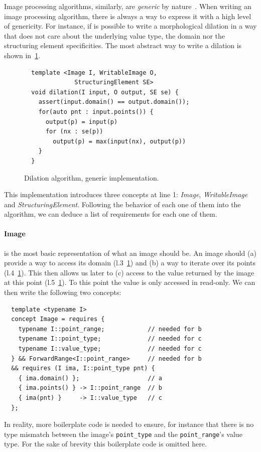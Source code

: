 Image processing algorithms, similarly, are \emph{generic} by
nature~\cite{ritter.1990.cvgi,geraud.2000.icpr,darbon.2002.ismm,levillain.2010.icip,levillain.2014.ciarp}. When writing
an image processing algorithm, there is always a way to express it with a high level of genericity. For instance, if is
possible to write a morphological dilation in a way that does not care about the underlying value type, the domain nor
the structuring element specificities. The most abstract way to write a dilation is shown in~\ref{code:gen.dilate}.

\begin{figure}[tbh]
  \centering
  \begin{verbatim}
  template <Image I, WritableImage O,
              StructuringElement SE>
  void dilation(I input, O output, SE se) {
    assert(input.domain() == output.domain());
    for(auto pnt : input.points()) {
      output(p) = input(p)
      for (nx : se(p))
        output(p) = max(input(nx), output(p))
    }
  }
  \end{verbatim}
  \caption{Dilation algorithm, generic implementation.}
  \label{code:gen.dilate}
\end{figure}

This implementation introduces three concepts at line 1: \emph{Image}, \emph{WritableImage} and
\emph{StructuringElement}. Following the behavior of each one of them into the algorithm, we can deduce a list of
requirements for each one of them.

\paragraph{Image} is the most basic representation of what an image should be. An image should (a) provide a way to
access its domain (l.3~\ref{code:gen.dilate}) and (b) a way to iterate over its points (l.4~\ref{code:gen.dilate}). This
then allows us later to (c) access to the value returned by the image at this point (l.5~\ref{code:gen.dilate}). To this
point the value is only accessed in read-only. We can then write the following two concepts:
\begin{verbatim}
  template <typename I>
  concept Image = requires {
    typename I::point_range;            // needed for b
    typename I::point_type;             // needed for c
    typename I::value_type;             // needed for c
  } && ForwardRange<I::point_range>     // needed for b
  && requires (I ima, I::point_type pnt) {
    { ima.domain() };                   // a
    { ima.points() } -> I::point_range  // b
    { ima(pnt) }     -> I::value_type   // c
  };
\end{verbatim}
In reality, more boilerplate code is needed to ensure, for instance that there is no type mismatch between the image's
\texttt{point\_type} and the \texttt{point\_range}'s value type. For the sake of brevity this boilerplate code is
omitted here.

